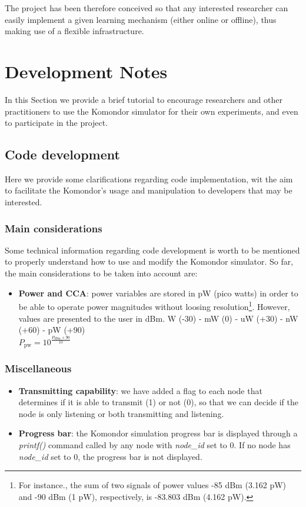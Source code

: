 \documentclass[a4paper]{article}
\begin{document}
The project has been therefore conceived so that any interested researcher can easily implement a given learning mechanism (either online or offline), thus making use of a flexible infrastructure.

\section{Development Notes}
\label{section:tutorial_and_development_notes}
In this Section we provide a brief tutorial to encourage researchers and other practitioners to use the Komondor simulator for their own experiments, and even to participate in the project. 

\subsection{Code development}
\label{section:code_development}		
Here we provide some clarifications regarding code implementation, wit the aim to facilitate the Komondor's usage and manipulation to developers that may be interested.
	
	\subsubsection{Main considerations}
	\label{section:development_considerations}
	Some technical information regarding code development is worth to be mentioned to properly understand how to use and modify the Komondor simulator. So far, the main considerations to be taken into account are:		
	\begin{itemize}
	\item \textbf{Power and CCA}: power variables are stored in pW (pico watts) in order to be able to operate power magnitudes without loosing resolution\footnote{For instance., the sum of two signals of power values -85 dBm (3.162 pW) and -90 dBm (1 pW), respectively, is -83.803 dBm (4.162 pW).}. However, values are presented to the user in dBm.		
	W (-30)  - mW (0)  - uW (+30) - nW (+60) - pW (+90)\\
	$P_{\text{pw}} = 10^{\frac{P_{\text{dBm}} + 90}{10}}$
	\end{itemize}

	\subsubsection{Miscellaneous}
	\label{section:development_miscellany}
	\begin{itemize}
	\item \textbf{Transmitting capability}: we have added a flag to each node that determines if it is able to transmit (1) or not (0), so that we can decide if the node is only listening or both transmitting and listening.
	\item \textbf{Progress bar}: the Komondor simulation progress bar is displayed through a \textit{printf()} command called by any node with \textit{node\_id} set to 0. If no node has \textit{node\_id} set to 0, the progress bar is not displayed.
	\end{itemize}
	
\end{document}

